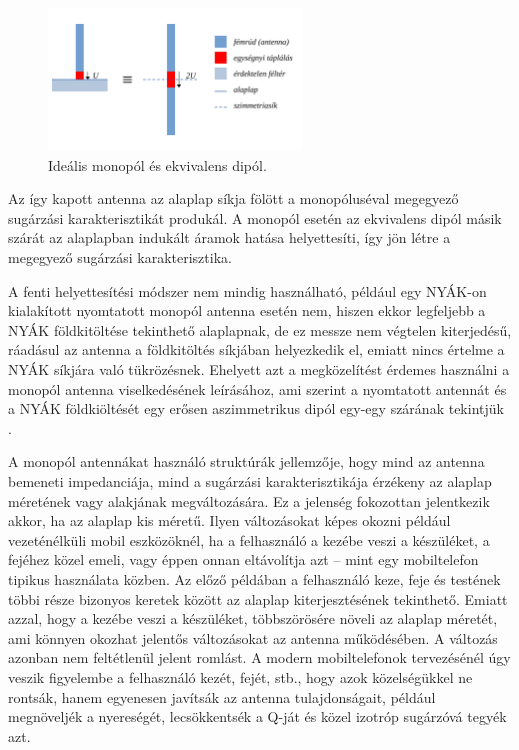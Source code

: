 \begin{figure}[h]
	\centering
	\includegraphics[width=0.6\textwidth]{kep/monopol.pdf}
	\caption{Ideális monopól és ekvivalens dipól.}
	\label{fig:monopol}
\end{figure}
\par Az így kapott antenna az alaplap síkja fölött a monopóluséval megegyező sugárzási karakterisztikát produkál. A monopól esetén az ekvivalens dipól másik szárát az alaplapban indukált áramok hatása helyettesíti, így jön létre a megegyező sugárzási karakterisztika.
\par A fenti helyettesítési módszer nem mindig használható, például egy NYÁK-on kialakított nyomtatott monopól antenna esetén nem, hiszen ekkor legfeljebb a NYÁK földkitöltése tekinthető alaplapnak, de ez messze nem végtelen kiterjedésű, ráadásul az antenna a földkitöltés síkjában helyezkedik el, emiatt nincs értelme a NYÁK síkjára való tükrözésnek. Ehelyett azt a megközelítést érdemes használni a monopól antenna viselkedésének leírásához, ami szerint a nyomtatott antennát és a NYÁK földkiöltését egy erősen aszimmetrikus dipól egy-egy szárának tekintjük \cite{multi-band}.
\par A monopól antennákat használó struktúrák jellemzője, hogy mind az antenna bemeneti impedanciája, mind a sugárzási karakterisztikája érzékeny az alaplap méretének vagy alakjának megváltozására. Ez a jelenség fokozottan jelentkezik akkor, ha az alaplap kis méretű. Ilyen változásokat képes okozni például vezeténélküli mobil eszközöknél, ha a felhasználó a kezébe veszi a készüléket, a fejéhez közel emeli, vagy éppen onnan eltávolítja azt -- mint egy mobiltelefon tipikus használata közben. Az előző példában a felhasználó keze, feje és testének többi része bizonyos keretek között az alaplap kiterjesztésének tekinthető. Emiatt azzal, hogy a kezébe veszi a készüléket, többszörösére növeli az alaplap méretét, ami könnyen okozhat jelentős változásokat az antenna működésében. A változás azonban nem feltétlenül jelent romlást. A modern mobiltelefonok tervezésénél úgy veszik figyelembe a felhasználó kezét, fejét, stb., hogy azok közelségükkel ne rontsák, hanem egyenesen javítsák az antenna tulajdonságait, például megnöveljék a nyereségét, lecsökkentsék a Q-ját és közel izotróp sugárzóvá tegyék azt.
